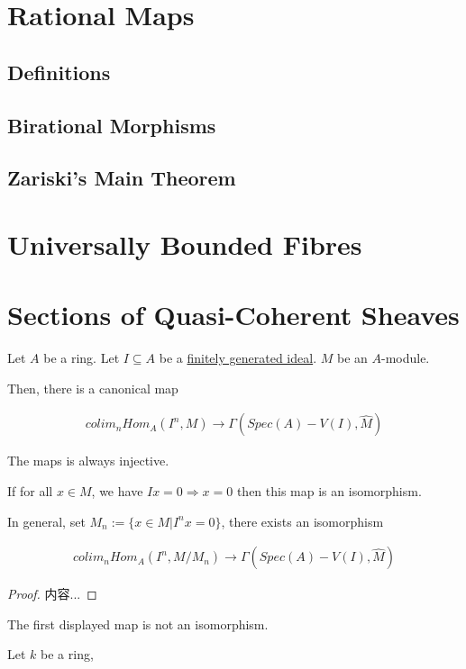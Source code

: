 \documentclass[Total.tex]{subfiles}
\begin{document}
		\section{Rational Maps}
			\subsection{Definitions}
			\subsection{Birational Morphisms}
			\subsection{Zariski's Main Theorem}
		\section{Universally Bounded Fibres}
		\section{Sections of Quasi-Coherent Sheaves}
		
			\begin{lemma}
				Let $A$ be a ring. Let $I\subseteq A$ be a \underline{finitely generated ideal}. $M$ be an $A$-module.
				
				Then, there is a canonical map
				
				\begin{gather*}
					colim_{n}Hom_A(I^n,M)\rightarrow \Gamma(Spec(A)-V(I),\hat{M})
				\end{gather*}
				
				The maps is always injective.
				
				If for all $x\in M$, we have $Ix=0\Rightarrow x=0$  then this map is an isomorphism.
				
				In general, set $M_n:=\{x\in M|I^nx=0\}$, there exists an isomorphism
				
				\begin{gather*}
					colim_n Hom_A(I^n,M/M_n)\rightarrow \Gamma(Spec(A)-V(I),\hat{M})
				\end{gather*}
			\end{lemma}
			
			\begin{proof}
				内容...
			\end{proof}
			
			\begin{example}
				The first displayed map is not an isomorphism. 
				
				Let $k$ be a ring, 
			\end{example}
			
\end{document}
